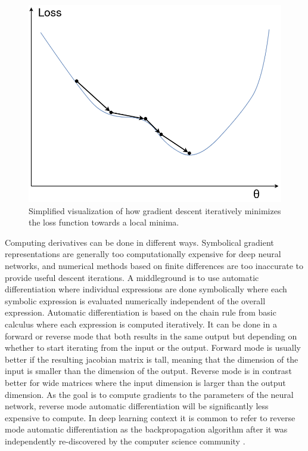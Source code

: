 \begin{figure}[H]
    \centering
    \includegraphics[width=0.8\linewidth]{Figures/Misc/gradientdescent.png}
    \caption{Simplified visualization of how gradient descent iteratively minimizes the loss function towards a local minima.}
    \label{fig:gradientdescent}
\end{figure}

Computing derivatives can be done in different ways. Symbolical gradient representations are generally too computationally expensive for deep neural networks, and numerical methods based on finite differences are too inaccurate to provide useful descent iterations. A middleground is to use automatic differentiation where individual expressions are done symbolically where each symbolic expression is evaluated numerically independent of the overall expression. Automatic differentiation is based on the chain rule from basic calculus where each expression is computed iteratively. It can be done in a forward or reverse mode that both results in the same output but depending on whether to start iterating from the input or the output. Forward mode is usually better if the resulting jacobian matrix is tall, meaning that the dimension of the input is smaller than the dimension of the output. Reverse mode is in contrast better for wide matrices where the input dimension is larger than the output dimension. As the goal is to compute gradients to the parameters of the neural network, reverse mode automatic differentiation will be significantly less expensive to compute. In deep learning context it is common to refer to reverse mode automatic differentiation as the backpropagation algorithm after it was independently re-discovered by the computer science community \cite{backprop86}.
 
